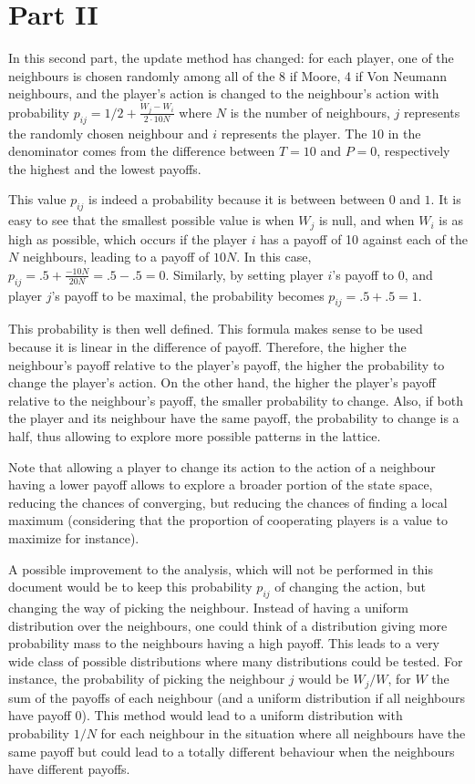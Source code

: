 \documentclass{article}
\begin{document}
\newpage

\section{Part II}

In this second part, the update method has changed: for each player, one of the neighbours is chosen randomly
among all of the 8 if Moore, 4 if Von Neumann neighbours, and the player's action is changed to the neighbour's
action with probability $p_{ij} = 1/2 + \frac {W_j-W_i}{2 \cdot 10N}$ where $N$ is the number of neighbours,
$j$ represents the randomly chosen neighbour and $i$ represents the player. The $10$ in the denominator comes from
the difference between $T=10$ and $P=0$, respectively the highest and the lowest payoffs.

This value $p_{ij}$ is indeed a probability because it is between between $0$ and $1$. It is easy to see
that the smallest possible value is when $W_j$ is null, and when $W_i$ is as high as possible, which occurs
if the player $i$ has a payoff of 10 against each of the $N$ neighbours, leading to a payoff of $10N$.
In this case, $p_{ij} = .5 + \frac {-10N}{20N} = .5 - .5 = 0$. Similarly, by setting player $i$'s payoff to 0,
and player $j$'s payoff to be maximal, the probability becomes $p_{ij} = .5 + .5 = 1$.

This probability is then well defined. This formula makes sense to be used because it is linear in the difference
of payoff. Therefore, the higher the neighbour's payoff relative to the player's payoff, the higher the
probability to change the player's action. On the other hand, the higher the player's payoff relative to the
neighbour's payoff, the smaller probability to change. Also, if both the player and its neighbour have the same
payoff, the probability to change is a half, thus allowing to explore more possible patterns in the lattice.

Note that allowing a player to change its action to the action of a neighbour having a lower payoff allows
to explore a broader portion of the state space, reducing the chances of converging, but reducing the chances
of finding a local maximum (considering that the proportion of cooperating players is a value to maximize for
instance).

A possible improvement to the analysis, which will not be performed in this document would be to keep this
probability $p_{ij}$ of changing the action, but changing the way of picking the neighbour. Instead of having
a uniform distribution over the neighbours, one could think of a distribution giving more probability mass
to the neighbours having a high payoff. This leads to a very wide class of possible distributions where
many distributions could be tested. For instance, the probability of picking the neighbour $j$ would be
$W_j/W$, for $W$ the sum of the payoffs of each neighbour (and a uniform distribution if all neighbours
have payoff 0). This method would lead to a uniform distribution with probability $1/N$ for each neighbour
in the situation where all neighbours have the same payoff but could lead to a totally different behaviour
when the neighbours have different payoffs.
\end{document}
